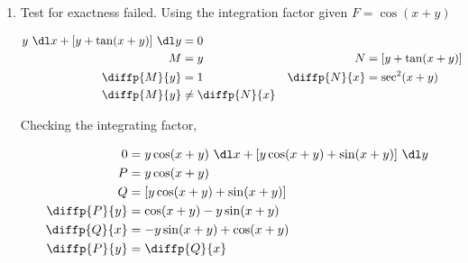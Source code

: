 \begin{enumerate}
          \begin{figure}[H]
              \centering
          \end{figure}

    \item Test for exactness failed. Using the integration factor given $ F = \cos(x+y) $

          \begin{align}
              y\ \dl x + [y + \tan(x + y)]\ \dl y & = 0                 \\
              M                                   & = y               &
              N                                   & = [y + \tan(x+y)]   \\
              \diffp{M}{y}                        & = 1               &
              \diffp{N}{x}                        & = \sec ^{2}(x+y)    \\
              \diffp{M}{y}                        & \neq \diffp{N}{x}
          \end{align}

          Checking the integrating factor,

          \begin{align}
              0            & = y \cos(x+y)\ \dl x + [y \cos(x+y) + \sin(x+y)]\ \dl y \\
              P            & = y \cos(x+y)                                           \\
              Q            & = [y \cos(x+y) + \sin(x+y)]                             \\
              \diffp{P}{y} & = \cos(x+y) - y \sin(x+y)                               \\
              \diffp{Q}{x} & = -y \sin(x+y) +\cos(x+y)                               \\
              \diffp{P}{y} & = \diffp{Q}{x}
          \end{align}


\end{enumerate}
